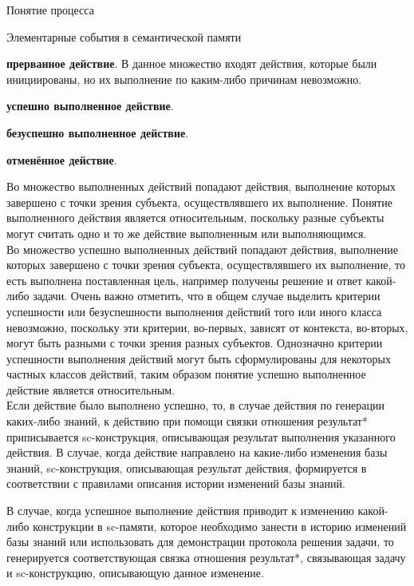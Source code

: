 \begin{frame}{\large Понятие процесса}
\begin{frame}{\large Элементарные события в семантической памяти}
\begin{frame}{}
\begin{textitemize}
        \item \textbf{прерванное действие}. В данное множество входят действия, которые были инициированы, но их выполнение по каким-либо причинам невозможно.
        \item \textbf{успешно выполненное действие}.
        \item \textbf{безуспешно выполненное действие}.
        \item \textbf{отменённое действие}.
    \end{textitemize}
\end{frame}
\begin{frame}{}
    Во множество выполненных действий попадают действия, выполнение которых завершено с точки зрения субъекта, осуществлявшего их выполнение. Понятие выполненного действия является относительным, поскольку разные субъекты могут считать одно и то же действие выполненным или выполняющимся.\\
    Во множество успешно выполненных действий попадают действия, выполнение которых завершено с точки зрения субъекта, осуществлявшего их выполнение, то есть выполнена поставленная цель, например получены решение и ответ какой-либо задачи. Очень важно отметить, что в общем случае выделить критерии успешности или безуспешности выполнения действий того или иного класса невозможно, поскольку эти критерии, во-первых, зависят от контекста, во-вторых, могут быть разными с точки зрения разных субъектов. Однозначно критерии успешности выполнения действий могут быть сформулированы для некоторых частных классов действий, таким образом понятие успешно выполненное действие является относительным.\\
    Если действие было выполнено успешно, то, в случае действия по генерации каких-либо знаний, к действию при помощи связки отношения результат* приписывается sc-конструкция, описывающая результат выполнения указанного действия. В случае, когда действие направлено на какие-либо изменения базы знаний, sc-конструкция, описывающая результат действия, формируется в соответствии с правилами описания истории изменений базы знаний.
\end{frame}
\begin{frame}{}
    В случае, когда успешное выполнение действия приводит к изменению какой-либо конструкции в sc-памяти, которое необходимо занести в историю изменений базы знаний или использовать для демонстрации протокола решения задачи, то генерируется соответствующая связка отношения результат*, связывающая задачу и sc-конструкцию, описывающую данное изменение.\\

\end{frame}
\end{frame}
\end{frame}
